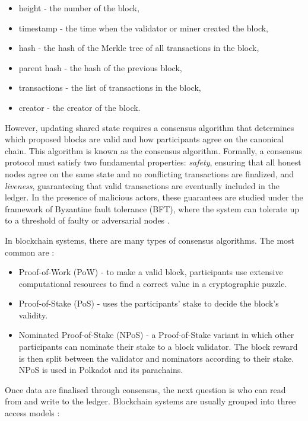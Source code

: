 \begin{itemize}
  \item height - the number of the block,
  \item timestamp - the time when the validator or miner created the block,
  \item hash - the hash of the Merkle tree of all transactions in the block,
  \item parent hash - the hash of the previous block,
  \item transactions - the list of transactions in the block,
  \item creator - the creator of the block.
\end{itemize}


However, updating shared state requires a consensus algorithm that determines which proposed blocks are valid and how participants agree on the canonical chain.
This algorithm is known as the consensus algorithm. Formally, a consensus protocol must satisfy two fundamental properties: \textit{safety}, ensuring that all honest nodes agree on the same state and no conflicting transactions are finalized, and \textit{liveness}, guaranteeing that valid transactions are eventually included in the ledger. In the presence of malicious actors, these guarantees are studied under the framework of Byzantine fault tolerance (BFT), where the system can tolerate up to a threshold of faulty or adversarial nodes \cite{Du2017}.

In blockchain systems, there are many types of consensus algorithms. The most common are \cite{Bach2018}:

\begin{itemize}
  \item[ ] Proof-of-Work (PoW) - to make a valid block, participants use extensive computational resources to find a correct value in a cryptographic puzzle.
  \item[ ] Proof-of-Stake (PoS) - uses the participants' stake to decide the block's validity.
  \item[ ] Nominated Proof-of-Stake (NPoS) - a Proof-of-Stake variant in which other participants can nominate their stake to a block validator.
  The block reward is then split between the validator and nominators according to their stake. NPoS is used in Polkadot and its parachains.
\end{itemize}

Once data are finalised through consensus, the next question is who can read from and write to the ledger. Blockchain systems are usually grouped into three access models \cite{Zheng2017}:

